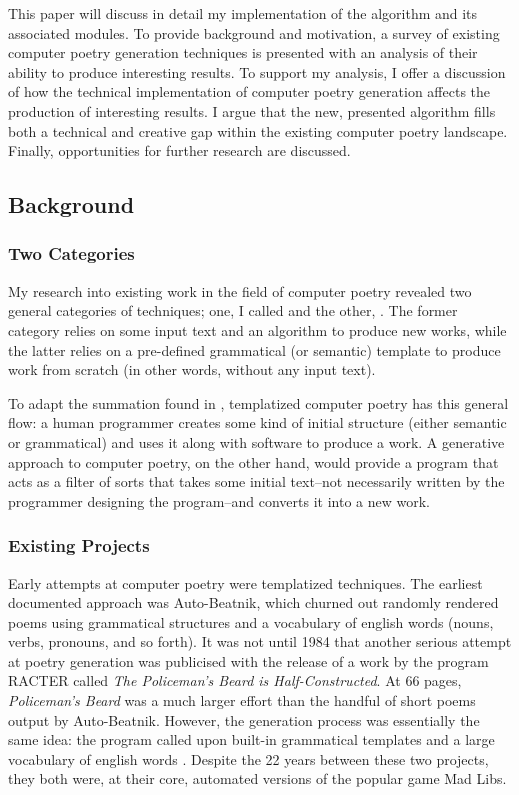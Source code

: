 \documentclass[10pt]{article}
\begin{document}
This paper will discuss in detail my implementation of the algorithm and its
associated modules. To provide background and motivation, a survey of existing
computer poetry generation techniques is presented with an analysis of their
ability to produce interesting results. To support my analysis, I offer a
discussion of how the technical implementation of computer poetry generation
affects the production of interesting results. I argue that the new, presented
algorithm fills both a technical and creative gap within the existing computer
poetry landscape. Finally, opportunities for further research are discussed.

\subsection{Background}
\subsubsection{Two Categories}
My research into existing work in the field of computer poetry revealed two
general categories of techniques; one, I called  and the other,
. The former category relies on some input text and an
algorithm to produce new works, while the latter relies on a pre-defined
grammatical (or semantic) template to produce work from scratch (in other
words, without any input text).  

To adapt the summation found in \cite{Hart96}, templatized computer poetry has
this general flow: a human programmer creates some kind of initial structure
(either semantic or grammatical) and uses it along with software to produce a
work. A generative approach to computer poetry, on the other hand, would
provide a program that acts as a filter of sorts that takes some initial
text--not necessarily written by the programmer designing the program--and
converts it into a new work. 

\subsubsection{Existing Projects}
Early attempts at computer poetry were templatized techniques. The earliest
documented approach was Auto-Beatnik, which churned out randomly rendered poems
using grammatical structures and a vocabulary of english words (nouns, verbs,
pronouns, and so forth).  It was not until 1984 that another serious attempt at
poetry generation was publicised with the release of a work by the program
RACTER called \emph{The Policeman's Beard is Half-Constructed}. At 66 pages,
\emph{Policeman's Beard} was a much larger effort than the handful of short
poems output by Auto-Beatnik. However, the generation process was essentially
the same idea: the program called upon built-in grammatical templates and a
large vocabulary of english words \cite{Chamb84}. Despite the 22 years between
these two projects, they both were, at their core, automated versions of the
popular game Mad Libs.
\end{document}
